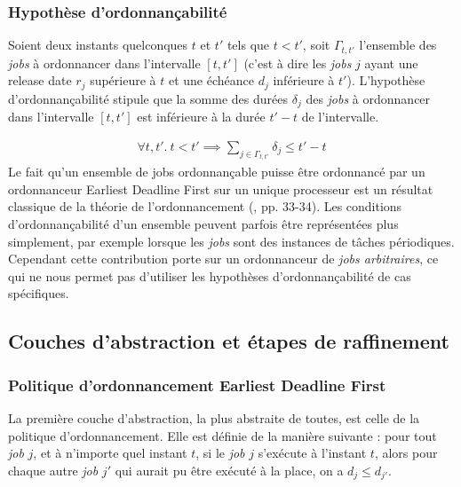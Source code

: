 	\subsubsection{Hypothèse d'ordonnançabilité}

	Soient deux instants quelconques $t$ et $t'$ tels que $t < t'$, soit $\Gamma_{t, t'}$ l'ensemble des \emph{jobs} à ordonnancer dans l'intervalle $[t, t']$ (c'est à dire les \emph{jobs} $j$ ayant une release date $r_j$ supérieure à $t$ et une échéance $d_j$ inférieure à $t'$).
	L'hypothèse d'ordonnançabilité stipule que la somme des durées $\delta_j$ des \emph{jobs} à ordonnancer dans l'intervalle $[t, t']$ est inférieure à la durée $t'-t$ de l'intervalle.

	\begin{gather} \label{eq:schedulability}
    		\forall t, t'. ~t < t' \implies
    		\sum_{j \in \Gamma_{t, t'}}\delta_j \leq t' - t
	\end{gather}
	Le fait qu'un ensemble de jobs ordonnançable puisse être ordonnancé par un ordonnanceur Earliest Deadline First sur un unique processeur est un résultat classique de la théorie de l'ordonnancement (\cite{stankovic2012deadline}, pp. 33-34). Les conditions d'ordonnançabilité d'un ensemble peuvent parfois être représentées plus simplement, par exemple lorsque les \emph{jobs} sont des instances de tâches périodiques. Cependant cette contribution porte sur un ordonnanceur de \emph{jobs arbitraires}, ce qui ne nous permet pas d'utiliser les hypothèses d'ordonnançabilité de cas spécifiques.

	\subsection{Couches d'abstraction et étapes de raffinement}

	\subsubsection{Politique d'ordonnancement Earliest Deadline First}
	\label{sec:policy}
	La première couche d'abstraction, la plus abstraite de toutes, est celle de la politique d'ordonnancement. Elle est définie de la manière suivante : pour tout \emph{job} $j$, et à n'importe quel instant $t$, si le \emph{job} $j$ s'exécute à l'instant $t$, alors pour chaque autre \emph{job} $j'$ qui aurait pu être exécuté à la place, on a $d_j \leq d_{j'}$.

